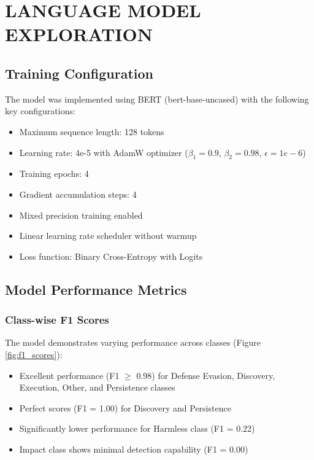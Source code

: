 
\section{LANGUAGE MODEL EXPLORATION}

    
    \subsection{Training Configuration}

        The model was implemented using BERT (bert-base-uncased) with the following key configurations:
        \begin{itemize}
            \item Maximum sequence length: 128 tokens
            \item Learning rate: 4e-5 with AdamW optimizer ($\beta_1=0.9$, $\beta_2=0.98$, $\epsilon=1e-6$)
            \item Training epochs: 4
            \item Gradient accumulation steps: 4
            \item Mixed precision training enabled
            \item Linear learning rate scheduler without warmup
            \item Loss function: Binary Cross-Entropy with Logits
        \end{itemize}
        
    \subsection{Model Performance Metrics}

        \subsubsection{Class-wise F1 Scores}
        
            The model demonstrates varying performance across classes (Figure \ref{fig:f1_scores}):

            \begin{itemize}
                \item Excellent performance (F1 $\geq$ 0.98) for Defense Evasion, Discovery, Execution, Other, and Persistence classes
                \item Perfect scores (F1 = 1.00) for Discovery and Persistence
                \item Significantly lower performance for Harmless class (F1 = 0.22)
                \item Impact class shows minimal detection capability (F1 = 0.00)
            \end{itemize}

